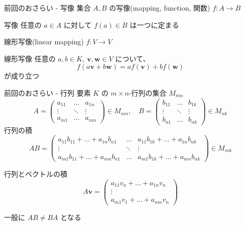\documentclass[dvipdfmx,12pt,a4paper,handout]{beamer}
\begin{document}
\begin{frame}{前回のおさらい - 写像}
 集合 $A, B$ の写像(mapping, function, 関数) $f : A \rightarrow B$

 \begin{block}{写像}
  任意の $a \in A$ に対して $f(a) \in B$ は一つに定まる
 \end{block}

 線形写像(linear mapping) $f : V \rightarrow V$

 \begin{block}{線形写像}
  任意の $a, b \in K,\  \bm{v}, \bm{w} \in V$ について、
  \[
  f(a\bm{v} + b\bm{w}) = a f(\bm{v}) + b f(\bm{w})
  \]
  が成り立つ
 \end{block}

\end{frame}

\begin{frame}{前回のおさらい - 行列}
 要素 $K$ の $m \times n$-行列の集合 $M_{mn}$
 \[
  A =
  \begin{pmatrix}
   a_{11} & \ldots & a_{1n}  \\
   \vdots & \ddots & \vdots  \\
   a_{m1} & \ldots & a_{mn}
  \end{pmatrix}
  \in M_{mn}, \hspace{1em}
  B =
  \begin{pmatrix}
   b_{11} & \ldots & b_{1k}  \\
   \vdots & \ddots & \vdots  \\
   b_{n1} & \ldots & b_{nk}
  \end{pmatrix}
  \in M_{nk}
 \]
 行列の積
 \[
  AB =
  \begin{pmatrix}
   a_{11}b_{11} + \dots + a_{1n}b_{n1} & \ldots & a_{11}b_{1k} + \dots + a_{1n}b_{nk}  \\
   \vdots & \ddots & \vdots  \\
   a_{m1}b_{11} + \dots + a_{mn}b_{n1} & \ldots & a_{m1}b_{1k} + \dots + a_{mn}b_{nk}
  \end{pmatrix}
  \in M_{mk}
 \]

 行列とベクトルの積
 \[
  A\bm{v} =
  \begin{pmatrix}
   a_{11}v_n + \dots + a_{1n}v_n \\
   \vdots \\
   a_{m1}v_1 +  \dots + a_{mn}v_n
  \end{pmatrix}
 \]

 一般に $AB \neq BA$ となる
\end{frame}
\end{document}
